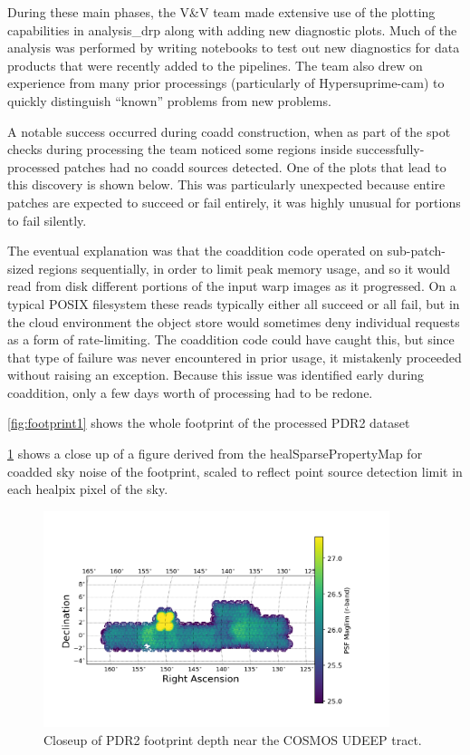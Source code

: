 During these main phases, the V\&V team made extensive use of the plotting capabilities in
analysis\_drp along with adding new diagnostic plots. Much of the analysis was performed by writing
notebooks to test out new diagnostics for data products that were recently added to the pipelines.
The team also drew on experience from many prior processings (particularly of Hypersuprime-cam) to
quickly distinguish ``known'' problems from new problems.

A notable success occurred during coadd construction, when as part of the spot checks during
processing the team noticed some regions inside successfully-processed patches had no coadd sources
detected. One of the plots that lead to this discovery is shown below. This was particularly
unexpected because entire patches are expected to succeed or fail entirely, it was highly unusual
for portions to fail silently.

The eventual explanation was that the coaddition code operated on sub-patch-sized regions
sequentially, in order to limit peak memory usage, and so it would read from disk different portions
of the input warp images as it progressed. On a typical POSIX filesystem these reads typically
either all succeed or all fail, but in the cloud environment the object store would sometimes deny
individual requests as a form of rate-limiting. The coaddition code could have caught this, but
since that type of failure was never encountered in prior usage, it mistakenly proceeded without
raising an exception. Because this issue was identified early during coaddition, only a few days
worth of processing had to be redone.










\ref{fig:footprint1} shows the whole footprint of the processed PDR2
dataset

 \ref{fig:footprint0} shows a close up of a figure derived from the healSparsePropertyMap for coadded sky noise of the footprint, scaled to reflect point
 source detection limit in each healpix pixel of the sky.

 \begin{figure}[h]
 \includegraphics[width=0.9\textwidth]{r-band-cosmos-pdr2.png}
	 \caption{Closeup of PDR2 footprint depth near the COSMOS UDEEP tract.  \label{fig:footprint0}}
 \end{figure}

